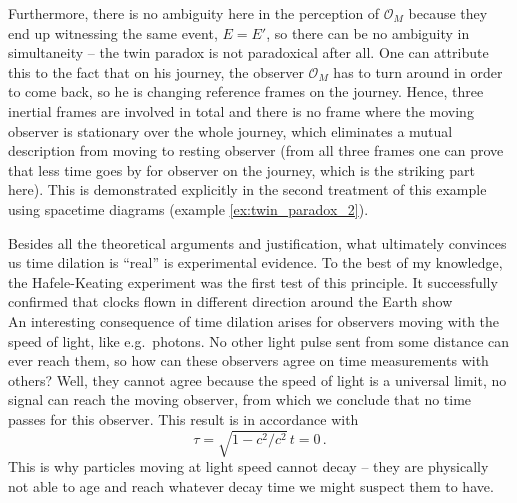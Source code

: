 \documentclass[../relativity_main.tex]{subfiles}
\begin{document}
\begin{ex}
	Furthermore, there is no ambiguity here in the perception of $\mathcal{O}_M$ because they end up witnessing the same event, $E = E'$, so there can be no ambiguity in simultaneity -- the twin paradox is not paradoxical after all. One can attribute this to the fact that on his journey, the observer $\mathcal{O}_M$ has to turn around in order to come back, so he is changing reference frames on the journey. Hence, three inertial frames are involved in total and there is no frame where the moving observer is stationary over the whole journey, which eliminates a mutual description from moving to resting observer (from all three frames one can prove that less time goes by for observer on the journey, which is the striking part here). This is demonstrated explicitly in the second treatment of this example using spacetime diagrams (example \ref{ex:twin_paradox_2}).
\end{ex}
%
Besides all the theoretical arguments and justification, what ultimately convinces us time dilation is \enquote{real} is experimental evidence. To the best of my knowledge, the Hafele-Keating experiment \cite{Hafele_1972} was the first test of this principle. It successfully confirmed that clocks flown in different direction around the Earth show \\


An interesting consequence of time dilation arises for observers moving with the speed of light, like e.g.~photons. No other light pulse sent from some distance can ever reach them, so how can these observers agree on time measurements with others? Well, they cannot agree because the speed of light is a universal limit, no signal can reach the moving observer, from which we conclude that no time passes for this observer. This result is in accordance with
\begin{equation}
	\tau = \sqrt{1 - c^2 / c^2} \, t = 0 \, .
\end{equation}
This is why particles moving at light speed cannot decay -- they are physically not able to age and reach whatever decay time we might suspect them to have.
\end{document}

